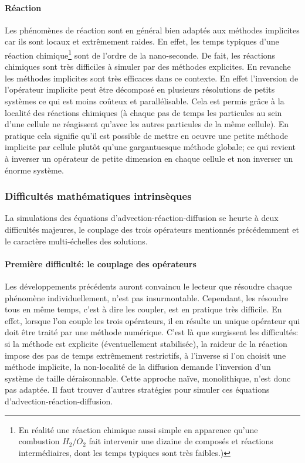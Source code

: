 \paragraph{Réaction}
    Les phénomènes de réaction sont en général bien adaptés aux méthodes implicites car ils sont locaux et extrêmement raides.
    En effet, les temps typiques d'une réaction chimique\footnote{
    En réalité une réaction chimique aussi simple en apparence qu'une combustion $H_2/O_2$ fait intervenir une dizaine de composés et réactions intermédiaires, dont les temps typiques sont très faibles.)} sont de l'ordre de la nano-seconde.
    De fait, les réactions chimiques sont très difficiles à simuler par des méthodes explicites.
    En revanche les méthodes implicites sont très efficaces dans ce contexte. En effet l'inversion de l'opérateur implicite 
    peut être décomposé en plusieurs résolutions de petits systèmes ce qui est moins coûteux et parallélisable. Cela est permis grâce à la localité des réactions chimiques
    (à chaque pas de temps les particules au sein d'une cellule ne réagissent qu'avec les autres particules de la même cellule).
    En pratique cela signifie qu'il est possible de mettre en oeuvre une petite méthode implicite par cellule plutôt qu'une gargantuesque méthode globale; 
    ce qui revient à inverser un opérateur de petite dimension en chaque cellule et non inverser un énorme système.

\subsubsection{Difficultés mathématiques intrinsèques}
    La simulations des équations d'advection-réaction-diffusion se heurte à deux difficultés majeures, le couplage des trois opérateurs mentionnés précédemment
    et le caractère multi-échelles des solutions.

    \paragraph{Première difficulté: le couplage des opérateurs}
        Les développements précédents auront convaincu le lecteur que résoudre chaque phénomène individuellement, n'est pas insurmontable. 
        Cependant, les résoudre tous en même temps, c'est à dire les coupler, est en pratique très difficile.
        En effet, lorsque l'on couple les trois opérateurs, il en résulte un unique opérateur qui doit être traité par une méthode numérique.
        C'est là que surgissent les difficultés: si la méthode est explicite (éventuellement stabilisée), la raideur de la réaction impose des pas de temps extrêmement restrictifs,
        à l'inverse si l'on choisit une méthode implicite, la non-localité de la diffusion demande l'inversion d'un système de taille déraisonnable. 
        Cette approche naïve, monolithique, n'est donc pas adaptée. Il faut trouver d'autres stratégies pour simuler ces équations d’advection-réaction-diffusion.

